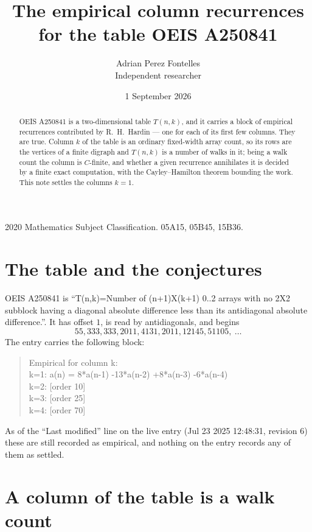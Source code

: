 \documentclass[11pt,a4paper]{article}
\title{The empirical column recurrences for the table OEIS A250841}
\author{Adrian Perez Fontelles\\ \small Independent researcher}
\date{1 September 2026}
\theoremstyle{plain}
\theoremstyle{definition}
\begin{document}
\maketitle

\begin{abstract}
OEIS A250841 is a two-dimensional table $T(n,k)$, and it carries a block of empirical
recurrences contributed by R.~H.~Hardin --- one for each of its first few columns. They are
true. Column $k$ of the table is an ordinary fixed-width array count, so its rows are the
vertices of a finite digraph and $T(n,k)$ is a number of walks in it; being a walk count the
column is $C$-finite, and whether a given recurrence annihilates it is decided by a finite
exact computation, with the Cayley--Hamilton theorem bounding the work. This note settles the columns $k=1$.
\end{abstract}

\noindent\small 2020 Mathematics Subject Classification. 05A15, 05B45, 15B36.\normalsize

\section{The table and the conjectures}

OEIS A250841 is ``T(n,k)=Number of (n+1)X(k+1) 0..2 arrays with no 2X2 subblock having a diagonal absolute difference less than its antidiagonal absolute difference.''. It has offset $1$, is
read by antidiagonals, and begins
\[
55, 333, 333, 2011, 4131, 2011, 12145, 51105,\ \dots
\]
The entry carries the following block:
\begin{quote}\small
Empirical for column k:\\
k=1: a(n) = 8*a(n-1) -13*a(n-2) +8*a(n-3) -6*a(n-4)\\
k=2: [order 10]\\
k=3: [order 25]\\
k=4: [order 70]\\
\end{quote}
As of the ``Last modified'' line on the live entry (Jul 23 2025 12:48:31, revision 6) these are still
recorded as empirical, and nothing on the entry records any of them as settled.

\section{A column of the table is a walk count}
\end{document}
